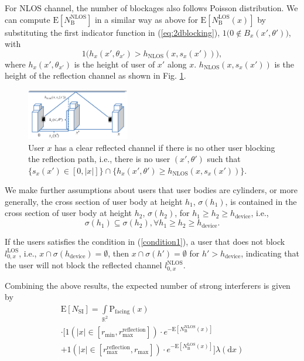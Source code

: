 \documentclass[10pt, conference, letterpaper]{IEEEtran}
\begin{document}
For NLOS channel, the number of blockages also follows Poisson distribution. We can compute $\mathrm{E}[N_{\mathrm{B}}^{\mathrm{NLOS}}]$ in a similar way as above for  $\mathrm{E}[N_{\mathrm{B}}^\mathrm{LOS}(x)]$ by substituting the first indicator function in (\ref{eq:2dblocking}), $\mathrm{1}\big(0\notin B_x(x',\theta')\big)$, with 
$$\mathrm{1}\big(h_{x}(x',\theta_{x'}) > h_{\mathrm{NLOS}}(x, s_x(x'))  \big),$$
where $h_{x}(x',\theta_{x'}) $ is the height of user of $x'$ along $x$. $h_{\mathrm{NLOS}}(x, s_x(x'))$ is the height of the reflection channel as shown in Fig. \ref{fig:NLOS}. 
\begin{figure}
	\centering
	\includegraphics[width = 0.4\textwidth]{Channel_NLOS.pdf}
	\caption{User $x$ has a clear reflected channel if there is no other user blocking the reflection path, i.e., there is no user $(x',\theta')$ such that $\{s_x(x')\in [0, |x|]\}\cap\{ h_x(x', \theta') \geq h_{\mathrm{NLOS}}(x, s_x(x'))\}$.}
	\label{fig:NLOS}
\end{figure}

We make further assumptions about users that user bodies are cylinders, or more generally, the cross section of user body at height $h_1$, $\sigma(h_1)$, is contained in the cross section of user body at height $h_2$, $\sigma(h_2)$, for $h_1\geq h_2\geq h_{\mathrm{device}}$, i.e., 
\begin{equation}\label{condition1}
\sigma(h_1)\subseteq \sigma(h_2), \forall h_1\geq h_2\geq h_{\mathrm{device}}.
\end{equation}

If the users satisfies the condition in (\ref{condition1}), a user that does not block $l_{0,x}^{\mathrm{LOS}}$, i.e., $x\cap \sigma(h_{\mathrm{device}}) = \emptyset$, then $x\cap \sigma(h') = \emptyset$ for $h'>h_{\mathrm{device}}$, indicating that the user will not block the reflected channel $l_{0,x}^{\mathrm{NLOS}}$. 

Combining the above results, the expected number of strong interferers is given by 
\begin{multline}\label{eq:E_N_SI}
	\mathrm{E}[N_{\mathrm{SI}}] =  \int\limits_{\mathbb{R}^2}
	\mathrm{P}_{\text{facing}}(x)\\
	\cdot \big[\text{1}(|x|\in[r_{\min},r_{\text{max}}^{\mathrm{reflection}}])
	\cdot e^{-\mathrm{E}[N_{\mathrm{B}}^\mathrm{NLOS}(x)]} \\
	 + \text{1}(|x|\in[r_{\text{max}}^{\mathrm{reflection}},r_{\text{max}}])
	 \cdot e^{-\mathrm{E}[N_{\mathrm{B}}^\mathrm{LOS}(x)]} \big]\lambda(\mathrm{d}x)
\end{multline}
\end{document}
